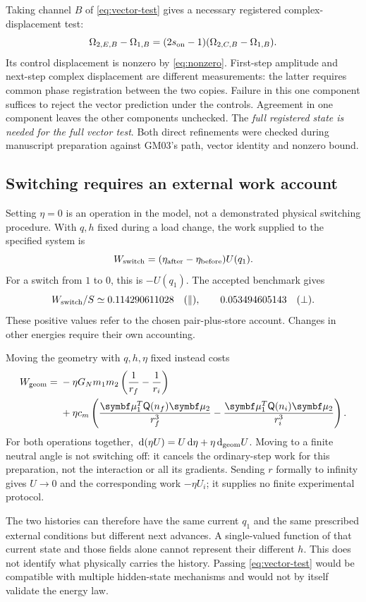 Taking channel \(B\) of \eqref{eq:vector-test} gives a necessary registered complex-displacement test:
\begin{equation}
 \Omega_{2,E,B}-\Omega_{1,B}
 =(2s_{\rm on}-1)(\Omega_{2,C,B}-\Omega_{1,B}).
 \label{eq:component-test}
\end{equation}
Its control displacement is nonzero by \eqref{eq:nonzero}. First-step amplitude and next-step complex displacement are different measurements: the latter requires common phase registration between the two copies. Failure in this one component suffices to reject the vector prediction under the controls. Agreement in one component leaves the other components unchecked. The \emph{full registered state is needed for the full vector test}. Both direct refinements were checked during manuscript preparation against GM03's path, vector identity and nonzero bound.

\subsection{Switching requires an external work account}
Setting \(\eta=0\) is an operation in the model, not a demonstrated physical switching procedure. With \(q,h\) fixed during a load change, the work supplied to the specified system is
\begin{equation}
 W_{\rm switch}=(\eta_{\rm after}-\eta_{\rm before})U(q_1).
 \label{eq:switch-work}
\end{equation}
For a switch from \(1\) to \(0\), this is \(-U(q_1)\). The accepted benchmark gives
\[
 W_{\rm switch}/S\simeq
 0.114290611028\quad(\parallel),\qquad
 0.053494605143\quad(\perp).
\]
These positive values refer to the chosen pair-plus-store account. Changes in other energies require their own accounting.

Moving the geometry with \(q,h,\eta\) fixed instead costs
\begin{equation}
\begin{split}
 W_{\rm geom}={}&-\eta G_Nm_1m_2\left(\frac1{r_f}-\frac1{r_i}\right)\\
 &+\eta c_m\left(
 \frac{\mub_1^T\Q(n_f)\mub_2}{r_f^3}
 -\frac{\mub_1^T\Q(n_i)\mub_2}{r_i^3}\right).
\end{split}\label{eq:geometry-work}
\end{equation}
For both operations together, \(\,\mathrm d(\eta U)=U\,\mathrm d\eta+\eta\,\mathrm d_{\rm geom}U\). Moving to a finite neutral angle is not switching off: it cancels the ordinary-step work for this preparation, not the interaction or all its gradients. Sending \(r\) formally to infinity gives \(U\to0\) and the corresponding work \(-\eta U_i\); it supplies no finite experimental protocol.

The two histories can therefore have the same current \(q_1\) and the same prescribed external conditions but different next advances. A single-valued function of that current state and those fields alone cannot represent their different \(h\). This does not identify what physically carries the history. Passing \eqref{eq:vector-test} would be compatible with multiple hidden-state mechanisms and would not by itself validate the energy law.
